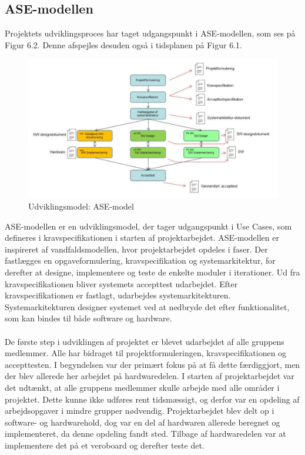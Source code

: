 \subsection{ASE-modellen}
Projektets udviklingsproces har taget udgangspunkt i ASE-modellen, som ses på Figur 6.2. Denne afspejles desuden også i tidsplanen på Figur 6.1. 
\begin{figure}[H]
	\centering
	\includegraphics[width=1\textwidth]{Figurer/asemodel}
	\caption{Udviklingsmodel: ASE-model \protect\cite[s. 6]{Vejledning}}
\end{figure}
ASE-modellen er en udviklingsmodel, der tager udgangspunkt i Use Cases, som defineres i kravspecifikationen i starten af projektarbejdet. ASE-modellen er inspireret af vandfaldsmodellen, hvor projektarbejdet opdeles i faser. Der fastlægges en opgaveformulering, kravspecifikation og systemarkitektur, for derefter at designe, implementere og teste de enkelte moduler i iterationer. Ud fra kravspecifikationen bliver systemets accepttest udarbejdet. Efter kravspecifikationen er fastlagt, udarbejdes systemarkitekturen. Systemarkitekturen designer systemet ved at nedbryde det efter funktionalitet, som kan bindes til både software og hardware. \\\\
De første step i udviklingen af projektet er blevet udarbejdet af alle gruppens medlemmer. Alle har bidraget til projektformuleringen, kravspecifikationen og accepttesten. I begyndelsen var der primært fokus på at få dette færdiggjort, men der blev allerede her arbejdet på hardwaredelen. I starten af projektarbejdet var det udtænkt, at alle gruppens medlemmer skulle arbejde med alle områder i projektet. Dette kunne ikke udføres rent tidsmæssigt, og derfor var en opdeling af arbejdsopgaver i mindre grupper nødvendig. Projektarbejdet blev delt op i software- og hardwarehold, dog var en del af hardwaren allerede beregnet og implementeret, da denne opdeling fandt sted. Tilbage af hardwaredelen var at implementere det på et veroboard og derefter teste det.\\\\

